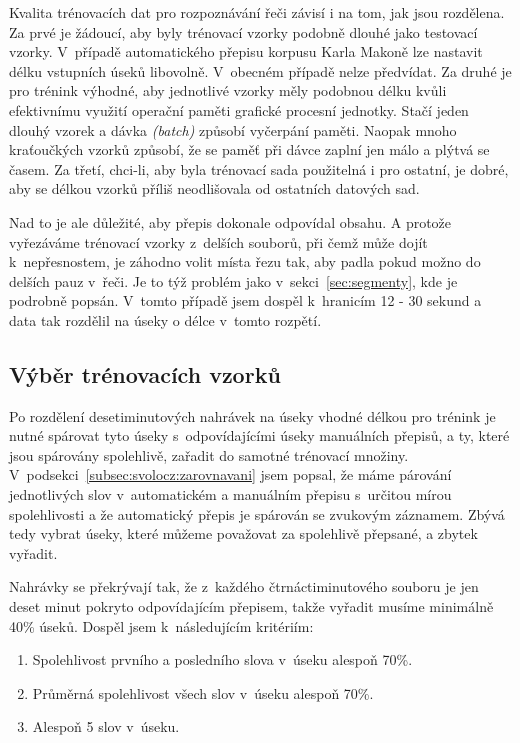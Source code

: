 Kvalita trénovacích dat pro rozpoznávání řeči závisí i na tom, jak jsou
rozdělena. Za prvé je žádoucí, aby byly trénovací vzorky podobně dlouhé
jako testovací vzorky\cite{nagorski2003search}.
V~případě automatického přepisu korpusu Karla Makoně lze
nastavit délku vstupních úseků libovolně. V~obecném případě nelze předvídat.
Za druhé je pro trénink výhodné, aby jednotlivé vzorky měly podobnou délku kvůli
efektivnímu využití operační paměti grafické procesní jednotky. Stačí jeden
dlouhý vzorek a dávka {\em (batch)} způsobí vyčerpání paměti. Naopak mnoho
kraťoučkých vzorků způsobí, že se paměť při dávce zaplní jen málo a plýtvá se
časem. Za třetí, chci-li, aby byla trénovací sada použitelná i pro ostatní,
je dobré, aby se délkou vzorků příliš neodlišovala od ostatních datových sad.

Nad to je ale důležité, aby přepis dokonale odpovídal obsahu. A protože
vyřezáváme trénovací vzorky z~delších souborů, při čemž může dojít
k~nepřesnostem, je záhodno volit místa řezu tak, aby padla pokud možno do
delších pauz v~řeči. Je to týž problém jako v~sekci~\ref{sec:segmenty}, kde je
podrobně popsán. V~tomto
případě jsem dospěl k~hranicím 12 - 30 sekund a data tak rozdělil na úseky o
délce v~tomto rozpětí.

\subsection{Výběr trénovacích vzorků}

Po rozdělení desetiminutových nahrávek na úseky vhodné délkou pro trénink je
nutné spárovat tyto úseky s~odpovídajícími úseky manuálních přepisů, a ty, které
jsou spárovány spolehlivě, zařadit do samotné trénovací množiny.
V~podsekci~\ref{subsec:svolocz:zarovnavani} jsem popsal, že máme párování
jednotlivých slov v~automatickém a manuálním přepisu s~určitou mírou
spolehlivosti a že automatický přepis je spárován se zvukovým záznamem. Zbývá
tedy vybrat úseky, které můžeme považovat za spolehlivě přepsané, a zbytek
vyřadit.

Nahrávky se překrývají tak, že z~každého čtrnáctiminutového souboru je jen deset
minut pokryto odpovídajícím přepisem, takže vyřadit musíme minimálně 40\% úseků.
Dospěl jsem k~následujícím kritériím:

\begin{enumerate}
\item{Spolehlivost prvního a posledního slova v~úseku alespoň 70\%.}
\item{Průměrná spolehlivost všech slov v~úseku alespoň 70\%.}
\item{Alespoň 5 slov v~úseku.}
\end{enumerate}

